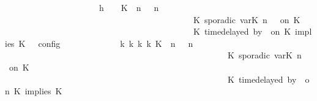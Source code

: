 \begin{isabellebody}
\ \ \ \ \ \ \ \ \isamarkupfalse%
\ {\isacharminus}\isanewline
\ \ \ \ \ \ \ \ \ \ \isamarkupfalse%
\ h{}{\isacharcolon}\ {\isacartoucheopen}{\isasymrho}\ {\isasymin}\ {\isasymlbrakk}\ {\isacharparenleft}{\isacharparenleft}K\ {\isasymUp}\ n{\isacharparenright}\ {\isacharhash}\ {\isasymGamma}{\isacharparenright}{\isacharcomma}\ n\ {\isasymturnstile}\ {\isasymPsi}\isanewline
\ \ \ \ \ \ \ \ \ \ \ \ \ \ \ \ \ \ \ \ \ \ \ \ \ \ \ \ \ \ \ \ \ \ \ \ \ \ \ \ \ \ \ {\isasymtriangleright}\ {\isacharparenleft}{\isacharparenleft}K\ sporadic{\isasymsharp}\ {\isasymlparr}{\isasymtau}\isactrlsub v\isactrlsub a\isactrlsub r{\isacharparenleft}K\ n{\isacharparenright}\ {\isasymoplus}\ {\isasymdelta}{\isasymtau}{\isasymrparr}\ on\ K\isanewline
\ \ \ \ \ \ \ \ \ \ \ \ \ \ \ \ \ \ \ \ \ \ \ \ \ \ \ \ \ \ \ \ \ \ \ \ \ \ \ \ \ \ \ {\isacharhash}\ {\isacharparenleft}K\ time{\isacharminus}delayed{\isasymsharp}\ by\ {\isasymdelta}{\isasymtau}\ on\ K\ implies\ K\ {\isacharhash}\ {\isasymPhi}{\isacharparenright}\ {\isasymrbrakk}\isactrlsub c\isactrlsub o\isactrlsub n\isactrlsub f\isactrlsub i\isactrlsub g{\isacartoucheclose}\isanewline
\ \ \ \ \ \ \ \ \ \ \isamarkupfalse%
\ \isamarkupfalse%
\ {\isacartoucheopen}{\isasymexists}{\isasymGamma}\isactrlsub k\ {\isasymPsi}\isactrlsub k\ {\isasymPhi}\isactrlsub k\ k{\isachardot}\ {\isacharparenleft}{\isacharparenleft}{\isacharparenleft}{\isacharparenleft}K\ {\isasymUp}\ n{\isacharparenright}\ {\isacharhash}\ {\isasymGamma}{\isacharparenright}{\isacharcomma}\ n\ {\isasymturnstile}\ {\isasymPsi}\isanewline
\ \ \ \ \ \ \ \ \ \ \ \ \ \ \ \ \ \ \ \ \ \ \ \ \ \ \ \ \ \ \ \ \ \ \ \ \ \ \ \ \ \ \ \ \ \ \ \ \ \ \ {\isasymtriangleright}\ {\isacharparenleft}{\isacharparenleft}K\ sporadic{\isasymsharp}\ {\isasymlparr}{\isasymtau}\isactrlsub v\isactrlsub a\isactrlsub r{\isacharparenleft}K\ n{\isacharparenright}\ {\isasymoplus}\ {\isasymdelta}{\isasymtau}{\isasymrparr}\ on\ K\isanewline
\ \ \ \ \ \ \ \ \ \ \ \ \ \ \ \ \ \ \ \ \ \ \ \ \ \ \ \ \ \ \ \ \ \ \ \ \ \ \ \ \ \ \ \ \ \ \ \ \ \ \ {\isacharhash}\ {\isacharparenleft}K\ time{\isacharminus}delayed{\isasymsharp}\ by\ {\isasymdelta}{\isasymtau}\ on\ K\ implies\ K\ {\isacharhash}\ {\isasymPhi}{\isacharparenright}{\isacharparenright}\isanewline

\end{isabellebody}
